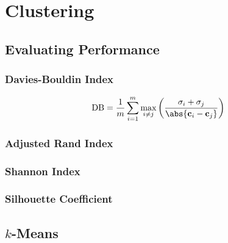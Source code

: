\chapter{Clustering}
\label{chap:cluster}

\section{Evaluating Performance}
\label{cluster:eval}

\subsection{Davies-Bouldin Index}
\label{cluster:eval:davies_bouldin}

\begin{equation} \label{eq:davies_bouldin}
\text{DB} = \frac{1}{m} \sum_{i=1}^{m} \max_{i \neq j} \left(\frac{\sigma_{i} + \sigma_{j}}{\abs{\mathbf{c}_{i} - \mathbf{c}_{j}}}\right)
\end{equation}

\subsection{Adjusted Rand Index}
\label{cluster:eval:adjusted_rand_index}

\subsection{Shannon Index}
\label{cluster:eval:shannon_index}

\subsection{Silhouette Coefficient}
\label{cluster:eval:silhouette}

\section{\texorpdfstring{$k$}{k}-Means}
\label{cluster:kMean}

